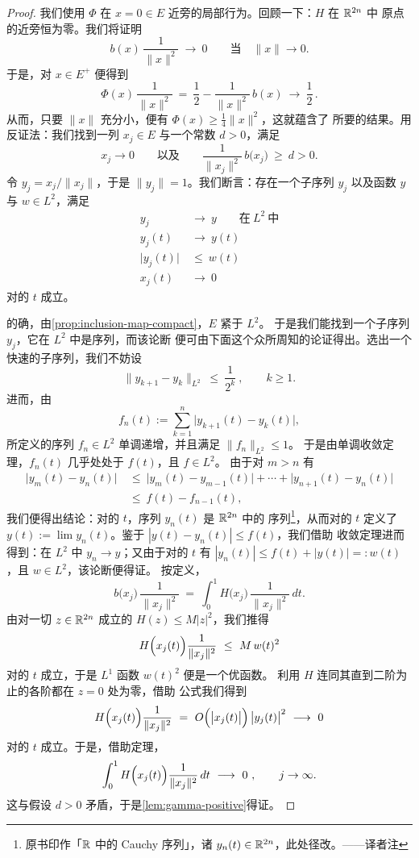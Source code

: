 \begin{proof}
我们使用 $\Phi$ 在 $x=0\in E$ 近旁的局部行为。回顾一下：$H$ 在 $\mathbb{R}^{2n}$ 中%
原点的近旁恒为零。我们将证明
\[
b(x)\,\frac{1}{\|x\|^{2}}\ \longrightarrow\ 0\qquad\text{当}\quad\|x\|\to0.
\]
于是，对 $x\in E^{+}$ 便得到
\[
\Phi(x)\,\frac{1}{\|x\|^{2}}\ =\ \frac{1}{2}-\frac{1}{\|x\|^{2}}\,b(x)%
\ \longrightarrow\ \frac{1}{2}\,.
\]
从而，只要 $\|x\|$ 充分小，便有 $\Phi(x)\geq\frac{1}{4}\|x\|^{2}$，这就蕴含了%
所要的结果。用反证法：我们找到一列 $x_{j}\in E$ 与一个常数 $d>0$，满足
\[
x_{j}\to0\qquad\text{以及}\qquad\frac{1}{\|x_{j}\|^{2}}\,b\bigl(x_{j}\bigr)%
\ \geq\ d>0.
\]
令 $y_{j}=x_{j}/\|x_{j}\|$，于是 $\|y_{j}\|=1$。我们断言：存在一个子序列%
$y_{j}$ 以及函数 $y$ 与 $w\in L^{2}$，满足
\begin{align*}
y_{j}\ &\longrightarrow\ y\qquad\text{在}\ L^{2}\ \text{中}\\
y_{j}(t)\ &\longrightarrow\ y(t)\\
\bigl|y_{j}(t)\bigr|\ &\leq\ w(t)\\
x_{j}(t)\ &\longrightarrow\ 0
\end{align*}
对\trAlmostEvery{}的 $t$ 成立。

的确，由\cref{prop:inclusion-map-compact}，$E$ 紧\trEmbedding{}于 $L^{2}$。%
于是我们能找到一个子序列 $y_{j}$，它在 $L^{2}$ 中是\trCauchy{}序列，而该论断%
便可由下面这个众所周知的论证得出。选出一个快速的\trCauchy{}子序列，我们不妨设
\[
\|y_{k+1}-y_{k}\|_{L^{2}}\ \leq\ \frac{1}{2^{k}}\ ,\qquad k\geq1.
\]
进而，由
\[
f_{n}(t):=\sum_{k=1}^{n}\bigl|y_{k+1}(t)-y_{k}(t)\bigr|,
\]
所定义的序列 $f_{n}\in L^{2}$ 单调递增，并且满足 $\|f_{n}\|_{L^{2}}\leq1$。%
于是由单调收敛定理，$f_{n}(t)$ 几乎处处\trConverge{}于 $f(t)$，且 $f\in L^{2}$。%
由于对 $m>n$ 有
\begin{align*}
\bigl|y_{m}(t)-y_{n}(t)\bigr|\ &\leq\ \bigl|y_{m}(t)-y_{m-1}(t)\bigr|+\dotsb+%
\bigl|y_{n+1}(t)-y_{n}(t)\bigr|\\
&\leq\ f(t)-f_{n-1}(t),
\end{align*}
我们便得出结论：对\trAlmostEverywhere{}的 $t$，序列 $y_{n}(t)$ 是 $\mathbb{R}^{2n}$ 中的%
\trCauchy{}序列\footnote{原书印作「$\mathbb{R}$ 中的 Cauchy 序列」，诸 $y_{n}(t)\in\mathbb{R}^{2n}$，此处径改。——译者注}，从而对\trAlmostEverywhere{}的 $t$ 定义了%
$y(t):=\lim y_{n}(t)$。鉴于 $|y(t)-y_{n}(t)|\leq f(t)$，我们借助\trLebesgue{}%
收敛定理进而得到：在 $L^{2}$ 中 $y_{n}\to y$；又由于对\trAlmostEverywhere{}的%
$t$ 有 $|y_{n}(t)|\leq f(t)+|y(t)|=:w(t)$，且 $w\in L^{2}$，该论断便得证。%
按定义，
\[
b\bigl(x_{j}\bigr)\,\frac{1}{\|x_{j}\|^{2}}\ =\ \int_{0}^{1}H\bigl(x_{j}\bigr)\,%
\frac{1}{\|x_{j}\|^{2}}\,dt.
\]
由对一切 $z\in\mathbb{R}^{2n}$ 成立的 $H(z)\leq M|z|^{2}$，我们推得
\[
H\Bigl(x_{j}(t)\Bigr)\frac{1}{\|x_{j}\|^{2}}\ \leq\ M\,w(t)^{2}
\]
对\trAlmostEvery{}的 $t$ 成立，于是 $L^{1}$ 函数 $w(t)^{2}$ 便是一个优函数。%
利用 $H$ 连同其直到二阶为止的各阶\trDerivative{}都在 $z=0$ 处为零，借助%
\trTaylor{}公式我们得到
\[
H\Bigl(x_{j}(t)\Bigr)\frac{1}{\|x_{j}\|^{2}}\ =\ O\Bigl(\bigl|x_{j}(t)\bigr|\Bigr)\,%
\bigl|y_{j}(t)\bigr|^{2}\ \longrightarrow\ 0
\]
对\trAlmostEvery{}的 $t$ 成立。于是，借助\trLebesgue{}定理，
\[
\int_{0}^{1}H\Bigl(x_{j}(t)\Bigr)\frac{1}{\|x_{j}\|^{2}}\,dt\ \longrightarrow\ 0\ ,%
\qquad j\to\infty.
\]
这与假设 $d>0$ 矛盾，于是\cref{lem:gamma-positive}得证。
\end{proof}

